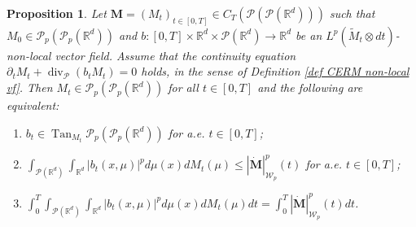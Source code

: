 \documentclass[10pt,leqno]{amsart}
\numberwithin{equation}{section}
\newtheorem{prop}[teorema]{Proposition}
\newcommand{\R}{\mathbb{R}}
\newcommand{\PP}{\mathcal{P}}
\begin{document}
\begin{prop}\label{prop:tangent}
    Let $\boldsymbol{M}=(M_t)_{t\in[0,T]} \in C_T(\PP(\PP(\R^d)))$ such that $M_0 \in \PP_p(\PP_p(\R^d))$ and $b:[0,T]\times \R^d \times \PP(\R^d)\to \R^d$ be an $L^p(\widetilde{M}_t\otimes dt)$-non-local vector field. Assume that the continuity equation $\partial_t M_t +\operatorname{div}_{\PP}(b_tM_t) = 0$ holds, in the sense of Definition \ref{def CERM non-local vf}. Then $M_t\in \PP_p(\PP_p(\R^d))$ for all $t\in [0,T]$ and the following are equivalent:
    \begin{enumerate}
        \item[(1)] $b_t \in \operatorname{Tan}_{M_t}\PP_p(\PP_p(\R^d))$ for a.e. $t\in [0,T]$;
        \item[(2)] $\int_{\PP(\R^d)}\int_{\R^d} |b_t(x,\mu)|^p d\mu(x)dM_t(\mu) \leq |\dot{\boldsymbol{M}}|_{\mathcal{W}_p}^p(t)$ for a.e. $t\in [0,T]$;
        \item[(3)] $\int_0^T\int_{\PP(\R^d)}\int_{\R^d} |b_t(x,\mu)|^p d\mu(x)dM_t(\mu)dt = \int_0^T |\dot{\boldsymbol{M}}|_{\mathcal{W}_p}^p(t)dt$.
    \end{enumerate}
\end{prop}
\end{document}
